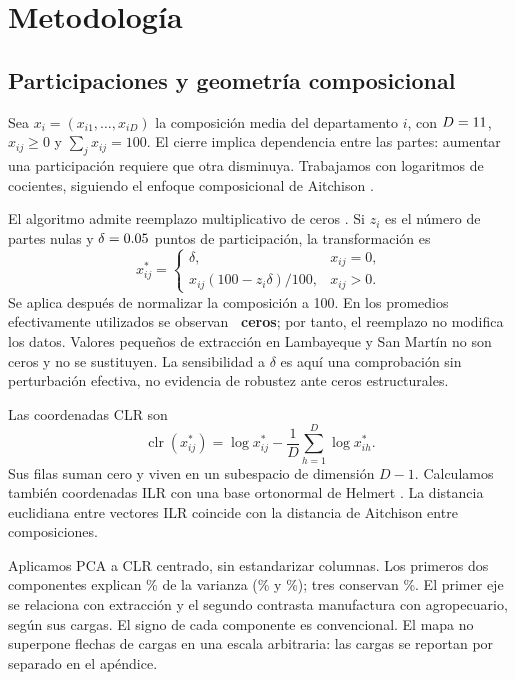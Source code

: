 \section{Metodología}
\subsection{Participaciones y geometría composicional}
Sea $x_i=(x_{i1},\ldots,x_{iD})$ la composición media del departamento $i$, con $D=11$, $x_{ij}\geq0$ y $\sum_jx_{ij}=100$. El cierre implica dependencia entre las partes: aumentar una participación requiere que otra disminuya. Trabajamos con logaritmos de cocientes, siguiendo el enfoque composicional de Aitchison \cite{aitchison}.

El algoritmo admite reemplazo multiplicativo de ceros \cite{martin}. Si $z_i$ es el número de partes nulas y $\delta=0.05$ puntos de participación, la transformación es
\begin{equation}
x^*_{ij}=\begin{cases}\delta,&x_{ij}=0,\\x_{ij}(100-z_i\delta)/100,&x_{ij}>0.\end{cases}
\end{equation}
Se aplica después de normalizar la composición a 100. En los promedios efectivamente utilizados se observan \textbf{\Zeros\ ceros}; por tanto, el reemplazo no modifica los datos. Valores pequeños de extracción en Lambayeque y San Martín no son ceros y no se sustituyen. La sensibilidad a $\delta$ es aquí una comprobación sin perturbación efectiva, no evidencia de robustez ante ceros estructurales.

Las coordenadas CLR son
\begin{equation}
\operatorname{clr}(x^*_{ij})=\log x^*_{ij}-\frac{1}{D}\sum_{h=1}^{D}\log x^*_{ih}.
\end{equation}
Sus filas suman cero y viven en un subespacio de dimensión $D-1$. Calculamos también coordenadas ILR con una base ortonormal de Helmert \cite{egozcue}. La distancia euclidiana entre vectores ILR coincide con la distancia de Aitchison entre composiciones.

Aplicamos PCA a CLR centrado, sin estandarizar columnas. Los primeros dos componentes explican \PcaCumulative\% de la varianza (\PcaOne\% y \PcaTwo\%); tres conservan \PcaThree\%. El primer eje se relaciona con extracción y el segundo contrasta manufactura con agropecuario, según sus cargas. El signo de cada componente es convencional. El mapa no superpone flechas de cargas en una escala arbitraria: las cargas se reportan por separado en el apéndice.

